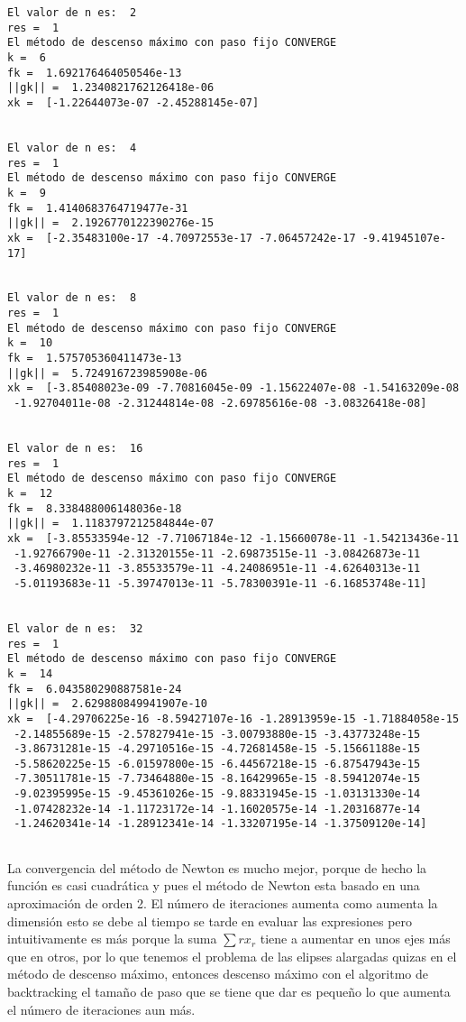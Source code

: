 \documentclass[11pt]{article}
\begin{document}
    \begin{Verbatim}[commandchars=\\\{\}]
El valor de n es:  2
res =  1
El método de descenso máximo con paso fijo CONVERGE
k =  6
fk =  1.692176464050546e-13
||gk|| =  1.2340821762126418e-06
xk =  [-1.22644073e-07 -2.45288145e-07]


El valor de n es:  4
res =  1
El método de descenso máximo con paso fijo CONVERGE
k =  9
fk =  1.4140683764719477e-31
||gk|| =  2.1926770122390276e-15
xk =  [-2.35483100e-17 -4.70972553e-17 -7.06457242e-17 -9.41945107e-17]


El valor de n es:  8
res =  1
El método de descenso máximo con paso fijo CONVERGE
k =  10
fk =  1.575705360411473e-13
||gk|| =  5.724916723985908e-06
xk =  [-3.85408023e-09 -7.70816045e-09 -1.15622407e-08 -1.54163209e-08
 -1.92704011e-08 -2.31244814e-08 -2.69785616e-08 -3.08326418e-08]


El valor de n es:  16
res =  1
El método de descenso máximo con paso fijo CONVERGE
k =  12
fk =  8.338488006148036e-18
||gk|| =  1.1183797212584844e-07
xk =  [-3.85533594e-12 -7.71067184e-12 -1.15660078e-11 -1.54213436e-11
 -1.92766790e-11 -2.31320155e-11 -2.69873515e-11 -3.08426873e-11
 -3.46980232e-11 -3.85533579e-11 -4.24086951e-11 -4.62640313e-11
 -5.01193683e-11 -5.39747013e-11 -5.78300391e-11 -6.16853748e-11]


El valor de n es:  32
res =  1
El método de descenso máximo con paso fijo CONVERGE
k =  14
fk =  6.043580290887581e-24
||gk|| =  2.629880849941907e-10
xk =  [-4.29706225e-16 -8.59427107e-16 -1.28913959e-15 -1.71884058e-15
 -2.14855689e-15 -2.57827941e-15 -3.00793880e-15 -3.43773248e-15
 -3.86731281e-15 -4.29710516e-15 -4.72681458e-15 -5.15661188e-15
 -5.58620225e-15 -6.01597800e-15 -6.44567218e-15 -6.87547943e-15
 -7.30511781e-15 -7.73464880e-15 -8.16429965e-15 -8.59412074e-15
 -9.02395995e-15 -9.45361026e-15 -9.88331945e-15 -1.03131330e-14
 -1.07428232e-14 -1.11723172e-14 -1.16020575e-14 -1.20316877e-14
 -1.24620341e-14 -1.28912341e-14 -1.33207195e-14 -1.37509120e-14]


    \end{Verbatim}

    La convergencia del método de Newton es mucho mejor, porque de hecho la
función es casi cuadrática y pues el método de Newton esta basado en una
aproximación de orden 2. El número de iteraciones aumenta como aumenta
la dimensión esto se debe al tiempo se tarde en evaluar las expresiones
pero intuitivamente es más porque la suma \(\sum rx_r\) tiene a aumentar
en unos ejes más que en otros, por lo que tenemos el problema de las
elipses alargadas quizas en el método de descenso máximo, entonces
descenso máximo con el algoritmo de backtracking el tamaño de paso que
se tiene que dar es pequeño lo que aumenta el número de iteraciones aun
más.
\end{document}
